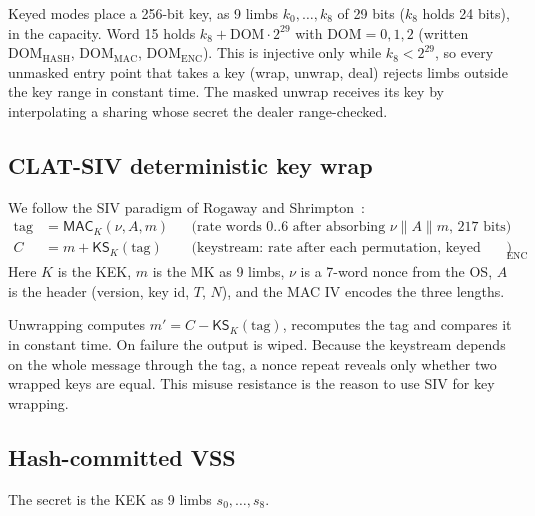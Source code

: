 \documentclass[10pt,a4paper]{article}
\newcommand{\MAC}{\mathsf{MAC}}
\newcommand{\KS}{\mathsf{KS}}
\theoremstyle{definition}
\theoremstyle{remark}
\begin{document}
Keyed modes place a 256-bit key, as 9 limbs $k_0,\dots,k_8$ of 29 bits ($k_8$ holds 24 bits), in the capacity. Word 15 holds $k_8 + \mathrm{DOM}\cdot 2^{29}$ with $\mathrm{DOM} = 0, 1, 2$ (written $\mathrm{DOM}_{\mathrm{HASH}}$, $\mathrm{DOM}_{\mathrm{MAC}}$, $\mathrm{DOM}_{\mathrm{ENC}}$). This is injective only while $k_8 < 2^{29}$, so every unmasked entry point that takes a key (wrap, unwrap, deal) rejects limbs outside the key range in constant time. The masked unwrap receives its key by interpolating a sharing whose secret the dealer range-checked.

\subsection{CLAT-SIV deterministic key wrap}\label{sec:siv}
We follow the SIV paradigm of Rogaway and Shrimpton~\cite{siv}:
\begin{align*}
  \text{tag} &= \MAC_K(\nu, A, m) && \text{(rate words 0..6 after absorbing } \nu \| A \| m\text{, 217 bits)}\\
  C &= m + \KS_K(\text{tag}) && \text{(keystream: rate after each permutation, keyed with DOM}_{\text{ENC}}\text{)}
\end{align*}
Here $K$ is the KEK, $m$ is the MK as 9 limbs, $\nu$ is a 7-word nonce from the OS, $A$ is the header (version, key id, $T$, $N$), and the MAC IV encodes the three lengths.

Unwrapping computes $m' = C - \KS_K(\text{tag})$, recomputes the tag and compares it in constant time. On failure the output is wiped. Because the keystream depends on the whole message through the tag, a nonce repeat reveals only whether two wrapped keys are equal. This misuse resistance is the reason to use SIV for key wrapping.

\subsection{Hash-committed VSS}\label{sec:vssdesign}
The secret is the KEK as 9 limbs $s_0,\dots,s_8$.
\end{document}
